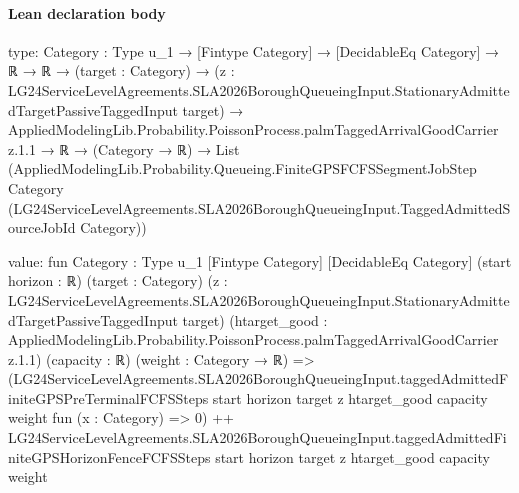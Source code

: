 \documentclass[10pt]{article}
\begin{document}
\paragraph{Lean declaration body}
\begin{ReviewVerbatim}
type:
{Category : Type u_1} →
  [Fintype Category] →
    [DecidableEq Category] →
      ℝ →
        ℝ →
          (target : Category) →
            (z :
                LG24ServiceLevelAgreements.SLA2026BoroughQueueingInput.StationaryAdmittedTargetPassiveTaggedInput
                  target) →
              AppliedModelingLib.Probability.PoissonProcess.palmTaggedArrivalGoodCarrier z.1.1 →
                ℝ →
                  (Category → ℝ) →
                    List
                      (AppliedModelingLib.Probability.Queueing.FiniteGPSFCFSSegmentJobStep Category
                        (LG24ServiceLevelAgreements.SLA2026BoroughQueueingInput.TaggedAdmittedSourceJobId Category))

value:
fun {Category : Type u_1} [Fintype Category] [DecidableEq Category] (start horizon : ℝ) (target : Category)
    (z : LG24ServiceLevelAgreements.SLA2026BoroughQueueingInput.StationaryAdmittedTargetPassiveTaggedInput target)
    (htarget_good : AppliedModelingLib.Probability.PoissonProcess.palmTaggedArrivalGoodCarrier z.1.1) (capacity : ℝ)
    (weight : Category → ℝ) =>
  (LG24ServiceLevelAgreements.SLA2026BoroughQueueingInput.taggedAdmittedFiniteGPSPreTerminalFCFSSteps start horizon
      target z htarget_good capacity weight fun (x : Category) => 0) ++
    LG24ServiceLevelAgreements.SLA2026BoroughQueueingInput.taggedAdmittedFiniteGPSHorizonFenceFCFSSteps start horizon
      target z htarget_good capacity weight
\end{ReviewVerbatim}
\end{document}
